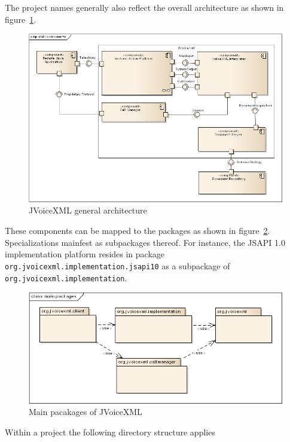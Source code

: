 \documentclass[11pt,a4paper]{article}
\begin{document}
The project names generally also reflect the overall architecture as shown in
figure~\ref{fig:main-components}.
\begin{figure}
\includegraphics[width=\linewidth]{main-components.png}
\caption{JVoiceXML general architecture}
\label{fig:main-components}
\end{figure}
These components can be mapped to the packages as shown in
figure~\ref{fig:main-packages}. Specializations mainfest as subpackages thereof.
For instance, the JSAPI 1.0 implementation platform resides in package 
\lstinline{org.jvoicexml.implementation.jsapi10} as a subpackage of
\lstinline{org.jvoicexml.implementation}.
\begin{figure}
\includegraphics[width=\linewidth]{main-packages.png}
\caption{Main pacakages of JVoiceXML}
\label{fig:main-packages}
\end{figure}


Within a project the following directory structure applies
\end{document}
